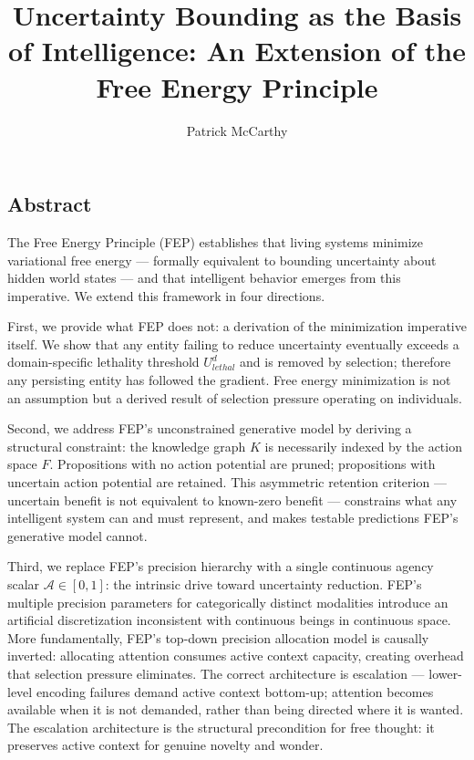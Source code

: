 \documentclass[
]{article}
\title{Uncertainty Bounding as the Basis of Intelligence: An Extension of the Free Energy Principle}
\author{Patrick McCarthy}
\date{}
\begin{document}
\maketitle


\subsection{Abstract}\label{abstract}

The Free Energy Principle (FEP) establishes that living systems minimize
variational free energy --- formally equivalent to bounding uncertainty
about hidden world states --- and that intelligent behavior emerges from
this imperative. We extend this framework in four directions.

First, we provide what FEP does not: a derivation of the minimization
imperative itself. We show that any entity failing to reduce uncertainty
eventually exceeds a domain-specific lethality threshold
\(U_{lethal}^d\) and is removed by selection; therefore any persisting
entity has followed the gradient. Free energy minimization is not an
assumption but a derived result of selection pressure operating on
individuals.

Second, we address FEP's unconstrained generative model by deriving a
structural constraint: the knowledge graph \(K\) is necessarily indexed
by the action space \(F\). Propositions with no action potential are
pruned; propositions with uncertain action potential are retained. This
asymmetric retention criterion --- uncertain benefit is not equivalent
to known-zero benefit --- constrains what any intelligent system can and
must represent, and makes testable predictions FEP's generative model
cannot.

Third, we replace FEP's precision hierarchy with a single continuous
agency scalar \(\mathcal{A} \in [0,1]\): the intrinsic drive toward
uncertainty reduction. FEP's multiple precision parameters for
categorically distinct modalities introduce an artificial discretization
inconsistent with continuous beings in continuous space. More
fundamentally, FEP's top-down precision allocation model is causally
inverted: allocating attention consumes active context capacity,
creating overhead that selection pressure eliminates. The correct
architecture is escalation --- lower-level encoding failures demand
active context bottom-up; attention becomes available when it is not
demanded, rather than being directed where it is wanted. The escalation
architecture is the structural precondition for free thought: it
preserves active context for genuine novelty and wonder.
\end{document}

